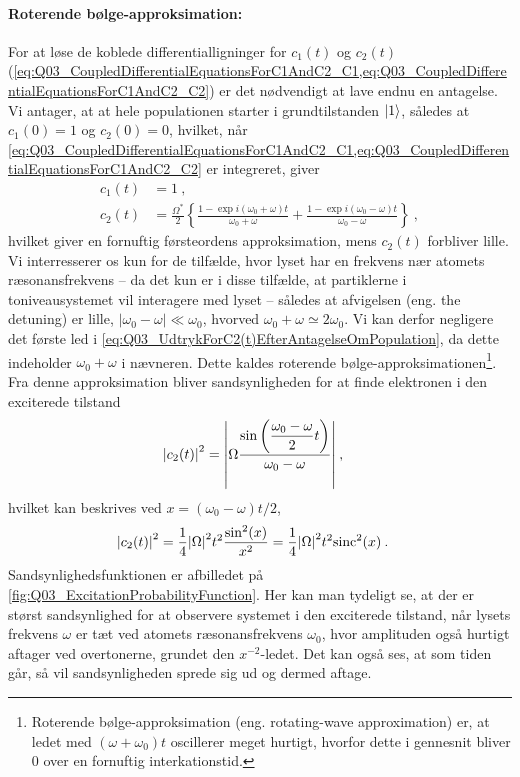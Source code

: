 \paragraph{Roterende bølge-approksimation:} For at løse de koblede differentialligninger for $c_1(t)$ og $c_2(t)$ (\cref{eq:Q03_CoupledDifferentialEquationsForC1AndC2_C1,eq:Q03_CoupledDifferentialEquationsForC1AndC2_C2}) er det nødvendigt at lave endnu en antagelse. Vi antager, at at hele populationen starter i grundtilstanden $\ket{1}$, således at $c_1(0) = 1$ og $c_2(0) = 0$, hvilket, når \cref{eq:Q03_CoupledDifferentialEquationsForC1AndC2_C1,eq:Q03_CoupledDifferentialEquationsForC1AndC2_C2} er integreret, giver
\begin{align}
    c_1(t) &= 1 \: , \label{eq:Q03_UdtrykForC1(t)EfterAntagelseOmPopulation}\\
    c_2(t) &= \frac{\Omega^*}{2} \left\{\frac{1 - \exp{i(\omega_0 + \omega)t}}{\omega_0 + \omega} + \frac{1 - \exp{i(\omega_0 - \omega)t}}{\omega_0 - \omega}\right\} \: , \label{eq:Q03_UdtrykForC2(t)EfterAntagelseOmPopulation}
\end{align}
hvilket giver en fornuftig førsteordens approksimation, mens $c_2(t)$ forbliver lille. Vi interresserer os kun for de tilfælde, hvor lyset har en frekvens nær atomets ræsonansfrekvens -- da det kun er i disse tilfælde, at partiklerne i toniveausystemet vil interagere med lyset -- således at afvigelsen (eng. the detuning) er lille, $|\omega_0 - \omega| \ll \omega_0$, hvorved $\omega_0 + \omega \simeq 2\omega_0$. Vi kan derfor negligere det første led i \cref{eq:Q03_UdtrykForC2(t)EfterAntagelseOmPopulation}, da dette indeholder $\omega_0 + \omega$ i nævneren. Dette kaldes \textsf{roterende bølge-approksimationen}\footnote{Roterende bølge-approksimation (eng. rotating-wave approximation) er, at ledet med $(\omega + \omega_0)t$ oscillerer meget hurtigt, hvorfor dette i gennesnit bliver $0$ over en fornuftig interkationstid.}. Fra denne approksimation bliver sandsynligheden for at finde elektronen i den exciterede tilstand
\begin{align}
    \abs{c_2(t)}^2 &= \abs{\Omega \dfrac{\sin\left(\dfrac{\omega_0 - \omega}{2}t\right)}{\omega_0 - \omega}} \: ,
\end{align}
hvilket kan beskrives ved $x = (\omega_0 - \omega)t/2$,
\begin{align} \label{eq:Q03_ExcitationProbabilityFunction}
    \abs{c_2(t)}^2 &= \frac{1}{4}\abs{\Omega}^2t^2\frac{\sin^2(x)}{x^2} = \frac{1}{4}\abs{\Omega}^2t^2\mathrm{sinc}^2(x) \: .
\end{align}
Sandsynlighedsfunktionen er afbilledet på \cref{fig:Q03_ExcitationProbabilityFunction}. Her kan man tydeligt se, at der er størst sandsynlighed for at observere systemet i den exciterede tilstand, når lysets frekvens $\omega$ er tæt ved atomets ræsonansfrekvens $\omega_0$, hvor amplituden også hurtigt aftager ved overtonerne, grundet den $x^{-2}$-ledet. Det kan også ses, at som tiden går, så vil sandsynligheden sprede sig ud og dermed aftage.

